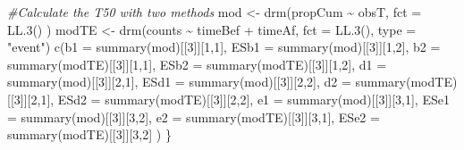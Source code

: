 \documentclass[
]{book}
\newenvironment{Shaded}{\begin{snugshade}}{\end{snugshade}}
\newcommand{\AttributeTok}[1]{\textcolor[rgb]{0.77,0.63,0.00}{#1}}
\newcommand{\CommentTok}[1]{\textcolor[rgb]{0.56,0.35,0.01}{\textit{#1}}}
\newcommand{\DecValTok}[1]{\textcolor[rgb]{0.00,0.00,0.81}{#1}}
\newcommand{\FunctionTok}[1]{\textcolor[rgb]{0.00,0.00,0.00}{#1}}
\newcommand{\NormalTok}[1]{#1}
\newcommand{\OtherTok}[1]{\textcolor[rgb]{0.56,0.35,0.01}{#1}}
\newcommand{\SpecialCharTok}[1]{\textcolor[rgb]{0.00,0.00,0.00}{#1}}
\newcommand{\StringTok}[1]{\textcolor[rgb]{0.31,0.60,0.02}{#1}}
\begin{document}
\begin{Shaded}
\begin{Highlighting}[]
    \CommentTok{\#Calculate the T50 with two methods}
\NormalTok{    mod }\OtherTok{\textless{}{-}} \FunctionTok{drm}\NormalTok{(propCum }\SpecialCharTok{\textasciitilde{}}\NormalTok{ obsT, }\AttributeTok{fct =} \FunctionTok{LL.3}\NormalTok{() )}
\NormalTok{    modTE }\OtherTok{\textless{}{-}} \FunctionTok{drm}\NormalTok{(counts }\SpecialCharTok{\textasciitilde{}}\NormalTok{ timeBef }\SpecialCharTok{+}\NormalTok{ timeAf, }
           \AttributeTok{fct =} \FunctionTok{LL.3}\NormalTok{(), }\AttributeTok{type =} \StringTok{"event"}\NormalTok{)}
    \FunctionTok{c}\NormalTok{(}\AttributeTok{b1 =} \FunctionTok{summary}\NormalTok{(mod)[[}\DecValTok{3}\NormalTok{]][}\DecValTok{1}\NormalTok{,}\DecValTok{1}\NormalTok{],}
      \AttributeTok{ESb1 =} \FunctionTok{summary}\NormalTok{(mod)[[}\DecValTok{3}\NormalTok{]][}\DecValTok{1}\NormalTok{,}\DecValTok{2}\NormalTok{],}
      \AttributeTok{b2 =} \FunctionTok{summary}\NormalTok{(modTE)[[}\DecValTok{3}\NormalTok{]][}\DecValTok{1}\NormalTok{,}\DecValTok{1}\NormalTok{],}
      \AttributeTok{ESb2 =} \FunctionTok{summary}\NormalTok{(modTE)[[}\DecValTok{3}\NormalTok{]][}\DecValTok{1}\NormalTok{,}\DecValTok{2}\NormalTok{],}
      \AttributeTok{d1 =} \FunctionTok{summary}\NormalTok{(mod)[[}\DecValTok{3}\NormalTok{]][}\DecValTok{2}\NormalTok{,}\DecValTok{1}\NormalTok{],}
      \AttributeTok{ESd1 =} \FunctionTok{summary}\NormalTok{(mod)[[}\DecValTok{3}\NormalTok{]][}\DecValTok{2}\NormalTok{,}\DecValTok{2}\NormalTok{],}
      \AttributeTok{d2 =} \FunctionTok{summary}\NormalTok{(modTE)[[}\DecValTok{3}\NormalTok{]][}\DecValTok{2}\NormalTok{,}\DecValTok{1}\NormalTok{],}
      \AttributeTok{ESd2 =} \FunctionTok{summary}\NormalTok{(modTE)[[}\DecValTok{3}\NormalTok{]][}\DecValTok{2}\NormalTok{,}\DecValTok{2}\NormalTok{],}
      \AttributeTok{e1 =} \FunctionTok{summary}\NormalTok{(mod)[[}\DecValTok{3}\NormalTok{]][}\DecValTok{3}\NormalTok{,}\DecValTok{1}\NormalTok{],}
      \AttributeTok{ESe1 =} \FunctionTok{summary}\NormalTok{(mod)[[}\DecValTok{3}\NormalTok{]][}\DecValTok{3}\NormalTok{,}\DecValTok{2}\NormalTok{],}
      \AttributeTok{e2 =} \FunctionTok{summary}\NormalTok{(modTE)[[}\DecValTok{3}\NormalTok{]][}\DecValTok{3}\NormalTok{,}\DecValTok{1}\NormalTok{],}
      \AttributeTok{ESe2 =} \FunctionTok{summary}\NormalTok{(modTE)[[}\DecValTok{3}\NormalTok{]][}\DecValTok{3}\NormalTok{,}\DecValTok{2}\NormalTok{] )}
\NormalTok{\}}


\end{Highlighting}
\end{Shaded}
\end{document}
